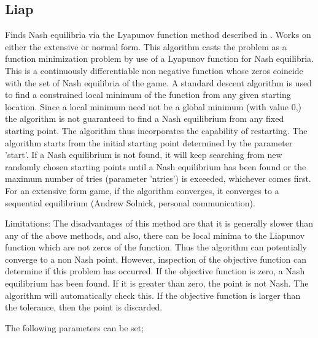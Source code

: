 {\subsection{Liap}\label{Liap}
Finds Nash equilibria via the Lyapunov function method
described in \cite{McK:91}.  Works on either the extensive or normal
form.  This algorithm casts the problem as a function minimization
problem by use of a Lyapunov function for Nash equilibria.  This is a
continuously differentiable non negative function whose zeros coincide
with the set of Nash equilibria of the game.  A standard descent
algorithm is used to find a constrained local minimum of the function
from any given starting location.  Since a local minimum need not be a
global minimum (with value 0,) the algorithm is not guaranteed to find
a Nash equilibrium from any fixed starting point.  The algorithm thus
incorporates the capability of restarting.  The algorithm starts from
the initial starting point determined by the parameter 'start'.  If a
Nash equilibrium is not found, it will keep searching from new
randomly chosen starting points until a Nash equilibrium has been
found or the maximum number of tries (parameter 'ntries') is exceeded,
whichever comes first.  For an extensive form game, if the algorithm
converges, it converges to a sequential equilibrium (Andrew Solnick,
personal communication).

Limitations: The disadvantages of this method are that it is generally
slower than any of the above methods, and also,  there can be local minima
to the Liapunov function which are not zeros of the function.  Thus the
algorithm can potentially converge to a non Nash point.  However,
inspection of the objective function can determine if this problem has
occurred.  If the objective function is zero, a Nash equilibrium has been
found. If it is greater than zero, the point is not Nash.  The algorithm
will automatically check this.  If the objective function is larger than the
tolerance, then the point is discarded.

The following parameters can be set;

}
